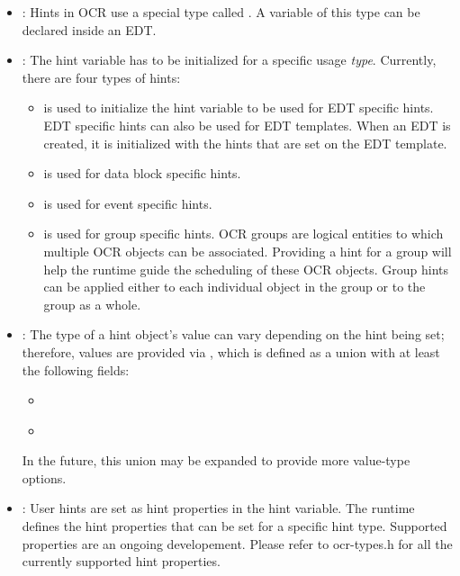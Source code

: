 \begin{itemize}
\item \hypertarget{type_ocrHint_t}{}: Hints in OCR use a special
type called . A variable of this type can be declared inside an EDT.

\item \hypertarget{type_ocrHintType_t}{}: The hint variable
has to be initialized for a specific usage {\em type}. Currently, there are four
types of hints:
\begin{itemize}
\item {} is used to initialize the hint variable to be
used for EDT specific hints. EDT specific hints can also be used for EDT
templates. When an EDT is created, it is initialized with the hints that are
set on the EDT template.
\item {} is used for data block specific hints.
\item {} is used for event specific hints.
\item {} is used for group specific hints.
OCR groups are logical entities to which multiple OCR objects can be associated.
Providing a hint for a group will help the runtime guide the scheduling of these
OCR objects. Group hints can be applied either to each individual object in the
group or to the group as a whole.
\end{itemize}

\item \hypertarget{type_ocrHintVal_t}{}: The type of a hint object's
  value can vary depending on the hint being set; therefore, values are provided via
  , which is defined as a union with at least the following fields:
\begin{itemize}
\item \hyperlink{type_s64}{}
\item \hyperlink{type_ocrGuid_t}{}
\end{itemize}
In the future, this union may be expanded to provide more value-type options.

\item \hypertarget{type_ocrHintProp_t}{}: User hints are
set as hint properties in the hint variable. The runtime defines the hint
properties that can be set for a specific hint type. Supported properties are
an ongoing developement. Please refer to ocr-types.h for all the currently
supported hint properties.
\end{itemize}

